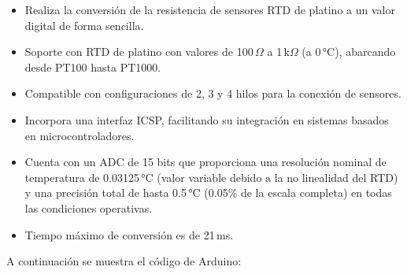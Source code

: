\documentclass[
  letterpaper,
]{scrbook}
\providecommand{\tightlist}{%
  \setlength{\itemsep}{0pt}\setlength{\parskip}{0pt}}\usepackage{longtable,booktabs,array}
\begin{document}
\begin{itemize}
\tightlist
\item
  Realiza la conversión de la resistencia de sensores RTD de platino a
  un valor digital de forma sencilla.
\item
  Soporte con RTD de platino con valores de 100\,\(\Omega\) a
  1\,k\(\Omega\) (a 0\,°C), abarcando desde PT100 hasta PT1000.
\item
  Compatible con configuraciones de 2, 3 y 4 hilos para la conexión de
  sensores.
\item
  Incorpora una interfaz ICSP, facilitando su integración en sistemas
  basados en microcontroladores.
\item
  Cuenta con un ADC de 15 bits que proporciona una resolución nominal de
  temperatura de 0.03125\,°C (valor variable debido a la no linealidad
  del RTD) y una precisión total de hasta 0.5\,°C (0.05\% de la escala
  completa) en todas las condiciones operativas.
\item
  Tiempo máximo de conversión es de 21\,ms.
\end{itemize}

A continuación se muestra el código de Arduino:
\end{document}
